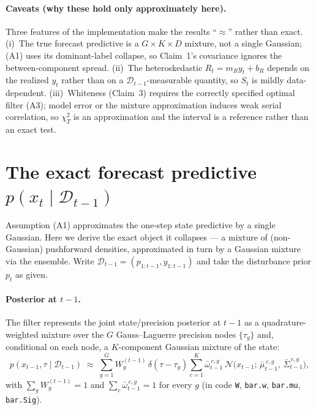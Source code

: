 \documentclass{article}
\newcommand{\Norm}{\mathcal{N}}
\begin{document}
\paragraph{Caveats (why these hold only approximately here).}
Three features of the implementation make the results ``$\approx$'' rather than exact.
(i)~The true forecast predictive is a $G\times K\times D$ mixture, not a single Gaussian;
(A1) uses its dominant-label collapse, so Claim~1's covariance ignores the between-component
spread. (ii)~The heteroskedastic $R_t = m_R y_t + b_R$ depends on the realized $y_t$ rather
than on a $\mathcal{D}_{t-1}$-measurable quantity, so $S_t$ is mildly data-dependent.
(iii)~Whiteness (Claim~3) requires the correctly specified optimal filter (A3); model error
or the mixture approximation induces weak serial correlation, so $\chi^2_T$ is an
approximation and the interval is a reference rather than an exact test.

\section{The exact forecast predictive $p(x_t \mid \mathcal{D}_{t-1})$}
\label{app:forecast-mixture}

Assumption (A1) approximates the one-step state predictive by a single Gaussian. Here we
derive the exact object it collapses --- a mixture of (non-Gaussian) pushforward densities,
approximated in turn by a Gaussian mixture via the ensemble. Write
$\mathcal{D}_{t-1}=(p_{1:t-1}, y_{1:t-1})$ and take the disturbance prior $p_t$ as given.

\paragraph{Posterior at $t-1$.} The filter represents the joint state/precision posterior at
$t-1$ as a quadrature-weighted mixture over the $G$ Gauss--Laguerre precision nodes
$\{\tau_g\}$ and, conditional on each node, a $K$-component Gaussian mixture of the state:
\[
  p(x_{t-1}, \tau \mid \mathcal{D}_{t-1})
  \;\approx\;
  \sum_{g=1}^{G} W^{(t-1)}_g\, \delta(\tau - \tau_g)
  \sum_{c=1}^{K} \bar\omega^{\,c,g}_{t-1}\,
  \Norm\!\big(x_{t-1};\, \bar\mu^{\,c,g}_{t-1},\, \bar\Sigma^{\,c,g}_{t-1}\big),
\]
with $\sum_g W^{(t-1)}_g = 1$ and $\sum_c \bar\omega^{\,c,g}_{t-1} = 1$ for every $g$ (in code
\lstinline{W}, \lstinline{bar.w}, \lstinline{bar.mu}, \lstinline{bar.Sig}).
\end{document}
